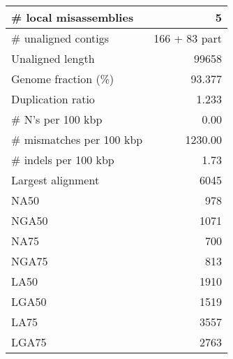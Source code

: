 \documentclass[12pt,a4paper]{article}
\begin{document}
\begin{table}[ht]
\begin{center}
\begin{tabular}{|l*{1}{|r}|}
\# local misassemblies & 5 \\ \hline
\# unaligned contigs & 166 + 83 part \\ \hline
Unaligned length & 99658 \\ \hline
Genome fraction (\%) & 93.377 \\ \hline
Duplication ratio & 1.233 \\ \hline
\# N's per 100 kbp & 0.00 \\ \hline
\# mismatches per 100 kbp & 1230.00 \\ \hline
\# indels per 100 kbp & 1.73 \\ \hline
Largest alignment & 6045 \\ \hline
NA50 & 978 \\ \hline
NGA50 & 1071 \\ \hline
NA75 & 700 \\ \hline
NGA75 & 813 \\ \hline
LA50 & 1910 \\ \hline
LGA50 & 1519 \\ \hline
LA75 & 3557 \\ \hline
LGA75 & 2763 \\ \hline
\end{tabular}
\end{center}
\end{table}
\end{document}
